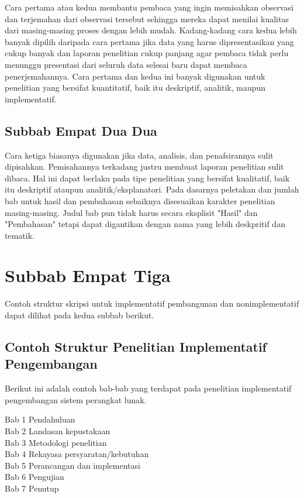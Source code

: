 Cara pertama atau kedua membantu pembaca yang ingin memisahkan observasi dan terjemahan dari observasi tersebut sehingga mereka dapat menilai kualitas dari masing-masing proses dengan lebih mudah. Kadang-kadang cara kedua lebih banyak dipilih daripada cara pertama jika data yang harus dipresentasikan yang cukup banyak dan laporan penelitian cukup panjang agar pembaca tidak perlu menunggu presentasi dari seluruh data selesai baru dapat membaca penerjemahannya. Cara pertama dan kedua ini banyak digunakan untuk penelitian yang bersifat kuantitatif, baik itu deskriptif, analitik, maupun implementatif.    

\subsection{Subbab Empat Dua Dua}

Cara ketiga biasanya digunakan jika data, analisis, dan penafsirannya sulit dipisahkan. Pemisahannya terkadang justru membuat laporan penelitian sulit dibaca. Hal ini dapat berlaku pada tipe penelitian yang bersifat kualitatif, baik itu deskriptif ataupun analitik/eksplanatori. 
Pada dasarnya peletakan dan jumlah bab untuk hasil dan pembahasan sebaiknya disesuaikan karakter penelitian masing-masing. Judul bab pun tidak harus secara eksplisit "Hasil" dan "Pembahasan" tetapi dapat digantikan dengan nama yang lebih deskpritif dan tematik. 

\section{Subbab Empat Tiga}

Contoh struktur skripsi untuk implementatif pembangunan dan nonimplementatif dapat dilihat pada kedua subbab berikut. 

\subsection{Contoh Struktur Penelitian Implementatif Pengembangan}

Berikut ini adalah contoh bab-bab yang terdapat pada penelitian implementatif pengembangan sistem perangkat lunak. 
\begin{displayquote}
  Bab 1 Pendahuluan \\
  Bab 2 Landasan kepustakaan \\
  Bab 3 Metodologi penelitian \\
  Bab 4 Rekayasa persyaratan/kebutuhan \\ 
  Bab 5 Perancangan dan implementasi \\
  Bab 6 Pengujian \\
  Bab 7 Penutup \\
\end{displayquote}


